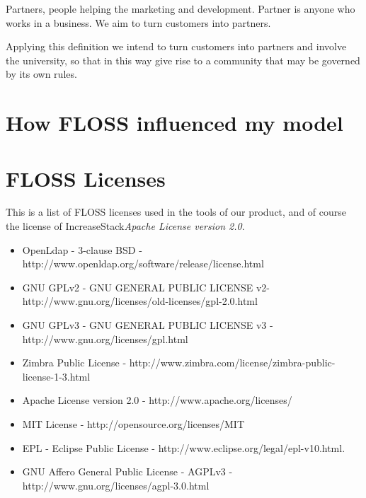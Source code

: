 \documentclass[11pt]{scrartcl}
\begin{document}
\par Partners, people helping the marketing and development. Partner is anyone who works in a business. We aim to turn customers into partners.

\par Applying this definition we intend to turn customers into partners and involve the university, so that in this way give rise to a community that may be governed by its own rules.

\section{How FLOSS influenced my model}


\section{FLOSS Licenses}\label{lic:floss}

This is a list of FLOSS licenses used in the tools of our product, and of course the license of IncreaseStack\emph{Apache License version 2.0}.

\begin{itemize}
    \item OpenLdap - 3-clause BSD - http://www.openldap.org/software/release/license.html
    \item GNU GPLv2 - GNU GENERAL PUBLIC LICENSE v2- http://www.gnu.org/licenses/old-licenses/gpl-2.0.html
    \item GNU GPLv3 - GNU GENERAL PUBLIC LICENSE v3 - http://www.gnu.org/licenses/gpl.html
    \item Zimbra Public License - http://www.zimbra.com/license/zimbra-public-license-1-3.html
    \item Apache License version 2.0 - http://www.apache.org/licenses/
    \item MIT License - http://opensource.org/licenses/MIT
    \item EPL - Eclipse Public License - http://www.eclipse.org/legal/epl-v10.html.
    \item GNU Affero General Public License - AGPLv3 - http://www.gnu.org/licenses/agpl-3.0.html
\end{itemize}
\end{document}

